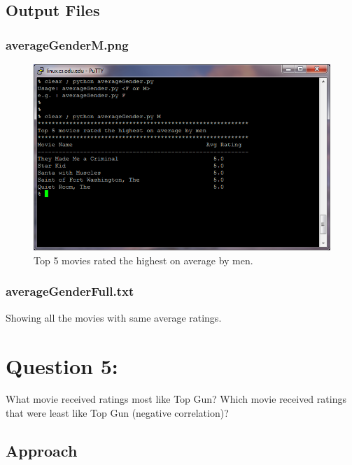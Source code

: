 \documentclass[12pt]{article}
\begin{document}
\subsection{Output Files}
\subsubsection{averageGenderM.png}
\begin{figure}[ht]
\includegraphics[scale=1.0]{../Q4/averageGenderM}
\centering
\caption{Top 5 movies rated the highest on average by men.}
\label{fig:averageGenderM}
\end{figure}
\newpage
\subsubsection{averageGenderFull.txt}
Showing all the movies with same average ratings.

\newpage

\section{Question 5:}
What movie received ratings most like Top Gun? Which movie
received ratings that were least like Top Gun (negative correlation)?
\subsection{Approach}
\end{document}
